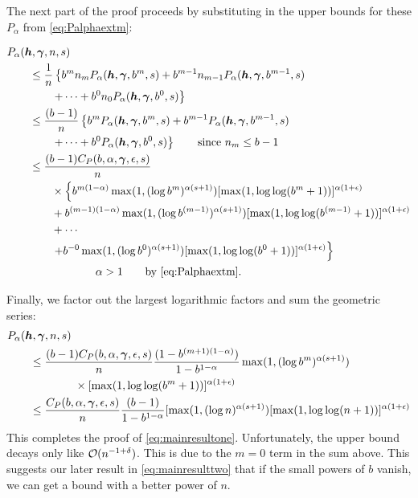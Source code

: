 \documentclass[authoryear]{elsarticle}
\begin{document}
The next part of the proof proceeds by substituting in the upper bounds for these $P_\alpha$ from \eqref{eq:Palphaextm}:

\begin{align} \label{eq:sameargument}
      \nonumber
      \MoveEqLeft
      P_\alpha(\vh,\vgamma,n,s) \\ & 
      \nonumber 
       \le  \frac {1}{n} \left\{ b^m n_m P_\alpha(\vh,\vgamma,b^m,s) + b^{m-1} n_{m-1} P_\alpha(\vh,\vgamma,b^{m-1},s) \right . \\
       \nonumber
       & \left . \qquad + \cdots + b^0 n_0 P_\alpha(\vh,\vgamma,b^0,s)  \right\} \\
       \nonumber
       &\le \frac {(b-1)}{n} \left\{ b^m  P_\alpha(\vh,\vgamma,b^m,s) + b^{m-1}  P_\alpha(\vh,\vgamma,b^{m-1},s) \right . \\
       \nonumber
       & \qquad \left . + \cdots + b^0  P_\alpha(\vh,\vgamma,b^0,s)  \right\} 
      \qquad \text{since $n_m \le b-1$}\\
      \nonumber
      & \le \frac {(b-1)C_{P}(b,\alpha,\vgamma,\epsilon,s)}{n} \\
      \nonumber
      & \qquad \times \left\{ b^{m(1-\alpha)}\max(1, (\log b^{m})^{\alpha(s+1)}) [\max(1,\log \log (
    b^m+1))]^{\alpha(1+\epsilon)}\right .\\ 
    \nonumber
      & \qquad  + b^{(m-1)(1-\alpha)}\max(1, (\log b^{(m-1)})^{\alpha(s+1)}) [\max(1,\log \log (
    b^{(m-1)}+1))]^{\alpha(1+\epsilon)}\\
      \nonumber
      & \qquad + \cdots \\
       \nonumber
      & \qquad  \left . + b^{-0}\max(1, (\log b^{0})^{\alpha(s+1)}) [\max(1,\log \log (
    b^{0}+1))]^{\alpha(1+\epsilon)} \right\}\\
      & \qquad \qquad \qquad \alpha > 1 \qquad \text{by \eqref{eq:Palphaextm}} .
\end{align}

Finally, we factor out the largest logarithmic factors and sum the geometric series:
\begin{align*}
\MoveEqLeft P_\alpha(\vh,\vgamma,n,s) \\
      & \le \frac {(b-1)C_{P}(b,\alpha,\vgamma,\epsilon,s)}{n} \frac{(1 - b^{(m+1)(1-\alpha)})}{1 - b^{1-\alpha}}
      \max(1, (\log b^{m})^{\alpha(s+1)}) \\
      & \qquad \qquad \times [\max(1,\log \log (
    b^m+1))]^{\alpha(1+\epsilon)} \\
      & \le \frac {C_{P}(b,\alpha,\vgamma,\epsilon,s)}{n} \frac{(b-1)}{1 - b^{1-\alpha}}
  [\max(1, (\log n)^{\alpha(s+1)})
      [\max(1,\log \log (n+1))]^{\alpha(1+\epsilon)} 
\end{align*}
This completes the proof of \eqref{eq:mainresultone}. 
Unfortunately, the upper bound decays only like $\operatorname{{\mathcal O}}(n^{-1+\delta})$.  This is due to the $m = 0$ term in the sum above.  This suggests our later result in \eqref{eq:mainresulttwo} that if the small powers of $b$ vanish, we can get a bound with a better power of $n$.
\end{document}
